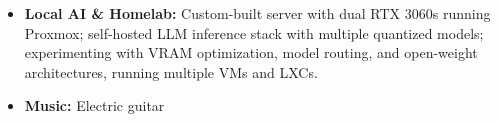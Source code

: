 
\begin{itemize}
	\item \textbf{Local AI \& Homelab:} Custom-built server with dual RTX 3060s running Proxmox; self-hosted LLM inference stack with multiple quantized models; experimenting with VRAM optimization, model routing, and open-weight architectures, running multiple VMs and LXCs.
	\item \textbf{Music:} Electric guitar
\end{itemize}
